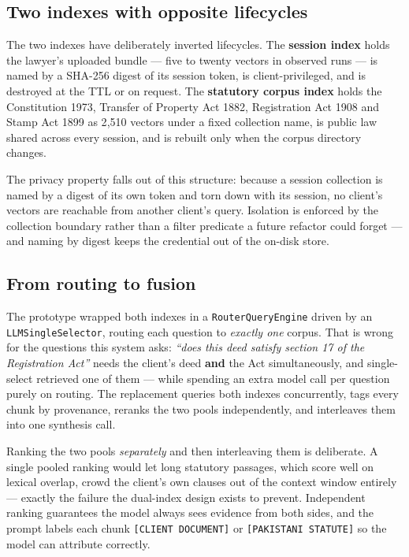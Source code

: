 \documentclass[11pt,a4paper]{article}
\newcommand{\code}[1]{\texttt{\small #1}}
\begin{document}
\subsection{Two indexes with opposite lifecycles}

The two indexes have deliberately inverted lifecycles. The \textbf{session index} holds the
lawyer's uploaded bundle --- five to twenty vectors in observed runs --- is named by a
SHA-256 digest of its session token, is client-privileged, and is destroyed at the TTL or on
request. The \textbf{statutory corpus index} holds the Constitution 1973, Transfer of
Property Act 1882, Registration Act 1908 and Stamp Act 1899 as 2{,}510 vectors under a fixed
collection name, is public law shared across every session, and is rebuilt only when the
corpus directory changes.

The privacy property falls out of this structure: because a session collection is named by a
digest of its own token and torn down with its session, no client's vectors are reachable
from another client's query. Isolation is enforced by the collection boundary rather than a
filter predicate a future refactor could forget --- and naming by digest keeps the
credential out of the on-disk store.

\subsection{From routing to fusion}

The prototype wrapped both indexes in a \code{RouterQueryEngine} driven by an
\code{LLMSingleSelector}, routing each question to \emph{exactly one} corpus. That is wrong
for the questions this system asks: \emph{``does this deed satisfy section 17 of the
Registration Act''} needs the client's deed \textbf{and} the Act simultaneously, and
single-select retrieved one of them --- while spending an extra model call per question
purely on routing. The replacement queries both indexes concurrently, tags every chunk by
provenance, reranks the two pools independently, and interleaves them into one synthesis
call.

Ranking the two pools \emph{separately} and then interleaving them is deliberate. A single pooled ranking would let long
statutory passages, which score well on lexical overlap, crowd the client's own clauses out
of the context window entirely --- exactly the failure the dual-index design exists to
prevent. Independent ranking guarantees the model always sees evidence from both sides, and
the prompt labels each chunk \code{[CLIENT DOCUMENT]} or \code{[PAKISTANI STATUTE]} so the
model can attribute correctly.
\end{document}
